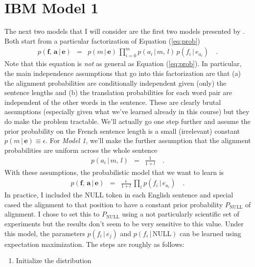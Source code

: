 \documentclass[11pt]{article}
\newcommand{\eq}[1]{Equation (\ref{eq:#1})}
\newcommand{\bvec}[1]{\ensuremath{\boldsymbol{#1}}}
\newcommand{\code}[1]{{\sffamily #1}}
\begin{document}
\section{IBM Model 1}

The next two models that I will consider are the first two models presented by
\citet{ibm}.
Both start from a particular factorization of \eq{prob}
\begin{eqnarray}
p(\bvec{f},\,\bvec{a}\,|\,\bvec{e}) &=&
    p(m\,|\,\bvec{e}) \, \prod_{i=0}^m p(a_i\,|\,m,\,l)\,p(f_i\,|\,e_{a_i})
    \quad.
\end{eqnarray}
Note that this equation is \emph{not} as general as \eq{prob}.
In particular, the main independence assumptions that go into this
factorization are that (a) the alignment probabilities are conditionally
independent given (only) the sentence lengths and (b) the translation
probabilities for each word pair are independent of the other words in the
sentence.
These are clearly brutal assumptions (especially given what we've learned
already in this course) but they do make the problem tractable.
We'll actually go one step further \citep[following][]{ibm} and assume the
prior probability on the French sentence length is a small (irrelevant)
constant $p(m\,|\,\bvec{e}) \equiv \epsilon$.
For \emph{Model 1}, we'll make the further assumption that the alignment
probabilities are uniform across the whole sentence
\begin{eqnarray}
p(a_i\,|\,m,\,l) &=& \frac{1}{1+l} \quad.
\end{eqnarray}
With these assumptions, the probabilistic model that we want to learn is
\begin{eqnarray}
p(\bvec{f},\,\bvec{a}\,|\,\bvec{e}) &=&
    \frac{\epsilon}{1+l}\,\prod_i p(f_i\,|\,e_{a_i}) \quad.
\end{eqnarray}
In practice, I included the \code{NULL} token in each English sentence and
special cased the alignment to that position to have a constant prior
probability $P_\mathrm{NULL}$ of alignment.
I chose to set this to $P_\mathrm{NULL}$ using a not particularly scientific
set of experiments but the results don't seem to be very sensitive to this
value.
Under this model, the parameters $p(f_i\,|\,e_j)$ and
$p(f_i\,|\,\mathrm{NULL})$ can be learned using expectation maximization.
The steps are roughly as follows:
\begin{enumerate}
\item{Initialize the distribution}
\end{enumerate}
\end{document}
